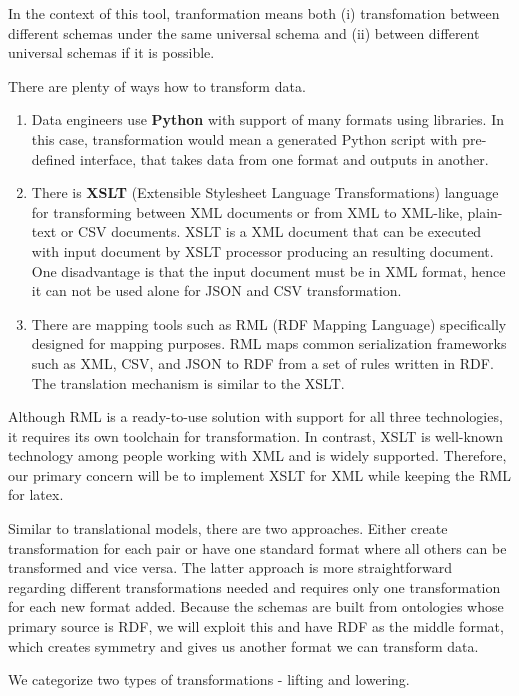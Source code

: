 In the context of this tool, tranformation means both (i) transfomation between different schemas under the same universal schema and (ii) between different universal schemas if it is possible.

There are plenty of ways how to transform data.
\begin{enumerate}
    \item Data engineers use \textbf{Python} with support of many formats using libraries. In this case, transformation would mean a generated Python script with pre-defined interface, that takes data from one format and outputs in another.
    \item There is \textbf{XSLT} (Extensible Stylesheet Language Transformations) language for transforming between XML documents or from XML to XML-like, plain-text or CSV documents. XSLT is a XML document that can be executed with input document by XSLT processor producing an resulting document. One disadvantage is that the input document must be in XML format, hence it can not be used alone for JSON and CSV transformation.
    \item There are mapping tools such as RML (RDF Mapping Language) specifically designed for mapping purposes. RML maps common serialization frameworks such as XML, CSV, and JSON to RDF from a set of rules written in RDF. The translation mechanism is similar to the XSLT.
\end{enumerate}

Although RML is a ready-to-use solution with support for all three technologies, it requires its own toolchain for transformation. In contrast, XSLT is well-known technology among people working with XML and is widely supported. Therefore, our primary concern will be to implement XSLT for XML while keeping the RML for latex.

Similar to translational models, there are two approaches. Either create transformation for each pair or have one standard format where all others can be transformed and vice versa. The latter approach is more straightforward regarding different transformations needed and requires only one transformation for each new format added. Because the schemas are built from ontologies whose primary source is RDF, we will exploit this and have RDF as the middle format, which creates symmetry and gives us another format we can transform data.

We categorize two types of transformations - lifting and lowering.

